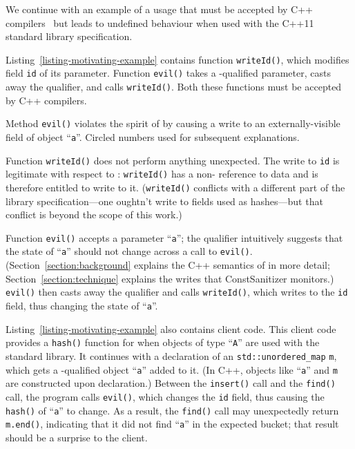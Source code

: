 We continue with an example of a \const{} usage that must be accepted by C++
compilers~\cite{programming-langauges-cpp-n3690} but leads to undefined
behaviour when used with the C++11 standard library specification.

Listing~\ref{listing-motivating-example} contains function \texttt{writeId()},
which modifies field \texttt{id} of its parameter.
Function \texttt{evil()} takes a \const{}-qualified parameter, casts away the
\const{} qualifier, and calls \texttt{writeId()}.
Both these functions must be accepted by C++ compilers.

\begin{listing}[!htb]
  \caption{Method \texttt{evil()} violates the spirit of \const{} by causing a
           write to an externally-visible field of \const{} object
           ``\texttt{a}''.
           Circled numbers used for subsequent explanations.}
  \label{listing-motivating-example}
  \centering
  
\end{listing}

Function \texttt{writeId()} does not perform anything unexpected.
The write to \texttt{id} is legitimate with respect to \const{}:
\texttt{writeId()} has a non-\const{} reference to data and is therefore
entitled to write to it.
(\texttt{writeId()} conflicts with a different part of the library
specification---one oughtn't write to fields used as hashes---but that
conflict is beyond the scope of this work.)

Function \texttt{evil()} accepts a \const{} parameter ``\texttt{a}''; the
\const{} qualifier intuitively suggests that the state of ``\texttt{a}'' should
not change across a call to \texttt{evil()}.
(Section~\ref{section:background} explains the C++ semantics of \const{} in more
detail; Section~\ref{section:technique} explains the writes that ConstSanitizer
monitors.)
\texttt{evil()} then casts away the \const{} qualifier and calls
\texttt{writeId()}, which writes to the \texttt{id} field, thus changing the
state of ``\texttt{a}''.

Listing~\ref{listing-motivating-example} also contains client code.
This client code provides a \texttt{hash()} function for when objects of type
``\texttt{A}'' are used with the standard library.
It continues with a declaration of an \texttt{std::unordered\_map} \texttt{m},
which gets a \const{}-qualified object ``\texttt{a}'' added to it.
(In C++, objects like ``\texttt{a}'' and \texttt{m} are constructed upon declaration.)
Between the \texttt{insert()} call and the \texttt{find()} call, the program
calls \texttt{evil()}, which changes the \texttt{id} field, thus causing the
\texttt{hash()} of ``\texttt{a}'' to change.
As a result, the \texttt{find()} call may unexpectedly return \texttt{m.end()},
indicating that it did not find ``\texttt{a}'' in the expected bucket; that
result should be a surprise to the client.

